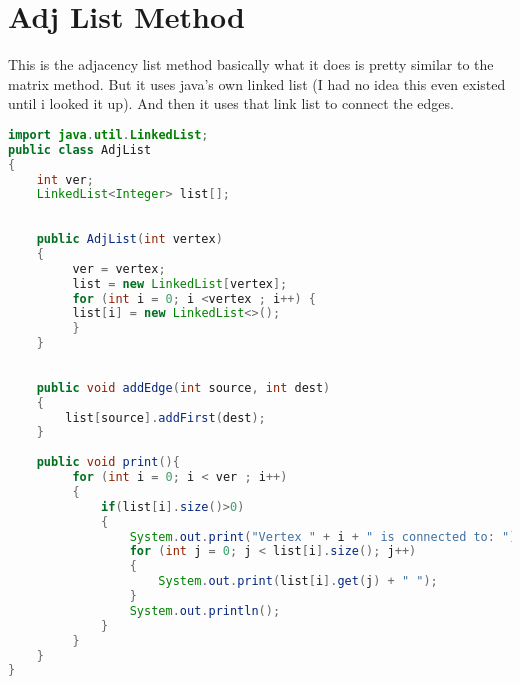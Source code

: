 \documentclass[letterpaper, 10pt]{article}
\begin{document}
\section{Adj List Method}
This is the adjacency list method basically what it does is pretty similar to the matrix method. But it uses java's own linked list (I had no idea this even existed until i looked it up). And then it uses that link list to connect the edges. 
\begin{lstlisting}[language = java]
import java.util.LinkedList;
public class AdjList 
{
	int ver;
	LinkedList<Integer> list[];
	
	
	public AdjList(int vertex) 
	{
		 ver = vertex;
		 list = new LinkedList[vertex];
		 for (int i = 0; i <vertex ; i++) {
		 list[i] = new LinkedList<>();
		 }
	}
	
	
	public void addEdge(int source, int dest)
	{
		list[source].addFirst(dest);
	}
	
	public void print(){
		 for (int i = 0; i < ver ; i++) 
		 {
			 if(list[i].size()>0) 
			 {
				 System.out.print("Vertex " + i + " is connected to: ");
				 for (int j = 0; j < list[i].size(); j++) 
				 {
					 System.out.print(list[i].get(j) + " ");
				 }
				 System.out.println();
			 }
		 }
	}
}


\end{lstlisting}
\end{document}
